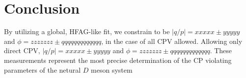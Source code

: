 \section{Conclusion}
\label{sec:Conclusion}
By utilizing a global, HFAG-like fit, we constrain to be $|q/p| = xxxxx\pm yyyyy$ 
and $\phi = zzzzzzz\pm qqqqqqqqqqqqq$, 
in the case of all CPV allowed. Allowing only direct CPV, $|q/p| = xxxxx\pm yyyyy$
and $\phi = zzzzzzz\pm qqqqqqqqqqqqq$.
These measurements represent the most precise determination of the CP violating
parameters of the netural $D$ meson system
